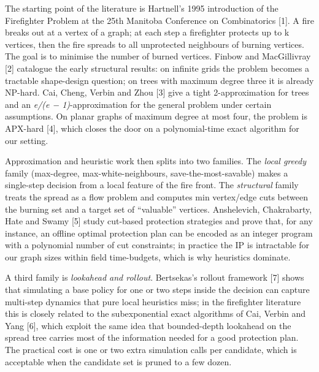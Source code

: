 \documentclass[
  11pt,
]{article}
\begin{document}
The starting point of the literature is Hartnell's 1995 introduction of
the Firefighter Problem at the 25th Manitoba Conference on Combinatorics
{[}1{]}. A fire breaks out at a vertex of a graph; at each step a
firefighter protects up to k vertices, then the fire spreads to all
unprotected neighbours of burning vertices. The goal is to minimise the
number of burned vertices. Finbow and MacGillivray {[}2{]} catalogue the
early structural results: on infinite grids the problem becomes a
tractable shape-design question; on trees with maximum degree three it
is already NP-hard. Cai, Cheng, Verbin and Zhou {[}3{]} give a tight
2-approximation for trees and an \emph{e/(e − 1)}-approximation for the
general problem under certain assumptions. On planar graphs of maximum
degree at most four, the problem is APX-hard {[}4{]}, which closes the
door on a polynomial-time exact algorithm for our setting.

Approximation and heuristic work then splits into two families. The
\emph{local greedy} family (max-degree, max-white-neighbours,
save-the-most-savable) makes a single-step decision from a local feature
of the fire front. The \emph{structural} family treats the spread as a
flow problem and computes min vertex/edge cuts between the burning set
and a target set of ``valuable'' vertices. Anshelevich, Chakrabarty,
Hate and Swamy {[}5{]} study cut-based protection strategies and prove
that, for any instance, an offline optimal protection plan can be
encoded as an integer program with a polynomial number of cut
constraints; in practice the IP is intractable for our graph sizes
within field time-budgets, which is why heuristics dominate.

A third family is \emph{lookahead and rollout}. Bertsekas's rollout
framework {[}7{]} shows that simulating a base policy for one or two
steps inside the decision can capture multi-step dynamics that pure
local heuristics miss; in the firefighter literature this is closely
related to the subexponential exact algorithms of Cai, Verbin and Yang
{[}6{]}, which exploit the same idea that bounded-depth lookahead on the
spread tree carries most of the information needed for a good protection
plan. The practical cost is one or two extra simulation calls per
candidate, which is acceptable when the candidate set is pruned to a few
dozen.
\end{document}
